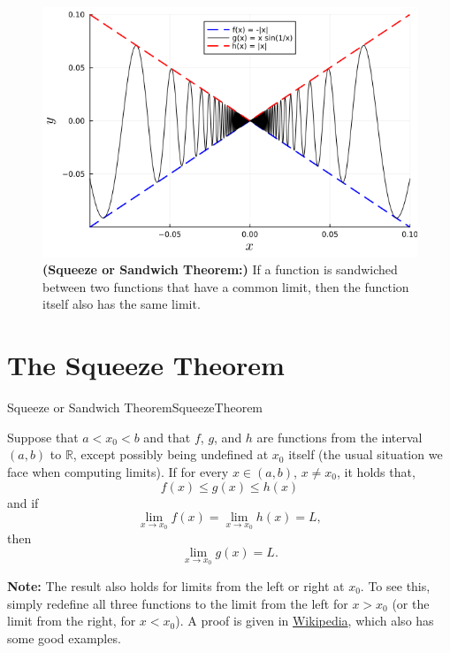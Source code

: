 \bigskip

\begin{figure}[htb]%
\centering
\includegraphics[width=0.7\columnwidth]{graphics/Chap04/SqueezeTheoremPlot.png}%
    \caption[]{\textbf{(Squeeze or Sandwich Theorem:)} If a function is sandwiched between two functions that have a common limit, then the function itself also has the same limit. }
    \label{fig:SqueezeTheorem}
\end{figure}

\section{The Squeeze Theorem}

\begin{propColor}{Squeeze or Sandwich Theorem}{SqueezeTheorem}

Suppose that $a < x_0 < b$ and that \(f\), \(g\), and \(h\) are functions from the interval $(a, b)$ to \(\mathbb{R}\), except possibly being undefined at $x_0$ itself (the usual situation we face when computing limits). If for every $x \in (a, b)$, $x \neq x_0$, it holds that,
\[f(x) \leq g(x) \leq h(x)\]
and if 
\[\lim_{x \to x_0} f(x) = \lim_{x \to x_0} h(x) = L,\]
then 
\[\lim_{x \to x_0} g(x) = L.\]  
\bigskip

\textbf{Note:} The result also holds for limits from the left or right at $x_0$. To see this, simply redefine all three functions to the limit from the left for $x>x_0$ (or the limit from the right, for $x < x_0$). A proof is given in \href{https://en.wikipedia.org/wiki/Squeeze_theorem}{Wikipedia}, which also has some good examples. 
\end{propColor}
\bigskip






\bigskip

